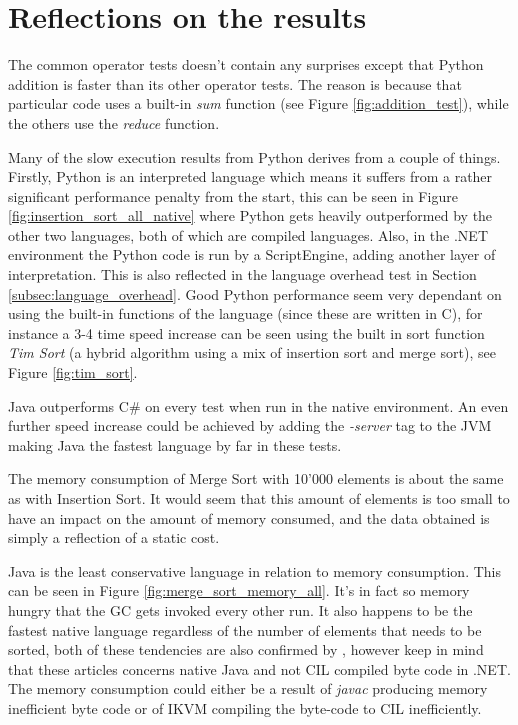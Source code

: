 \section{Reflections on the results}

The common operator tests doesn't contain any surprises except that Python addition is faster than its other operator tests. The reason is because that particular code uses a built-in \textit{sum} function (see Figure \ref{fig:addition_test}), while the others use the \textit{reduce} function.

Many of the slow execution results from Python derives from a couple of things. Firstly, Python is an interpreted language which means it suffers from a rather significant performance penalty from the start, this can be seen in Figure \ref{fig:insertion_sort_all_native} where Python gets heavily outperformed by the other two languages, both of which are compiled languages. Also, in the .NET environment the Python code is run by a ScriptEngine, adding another layer of interpretation. This is also reflected in the language overhead test in Section \ref{subsec:language_overhead}. Good Python performance seem very dependant on using the built-in functions of the language (since these are written in C), for instance a 3-4 time speed increase can be seen using the built in sort function \textit{Tim Sort} (a hybrid algorithm using a mix of insertion sort and merge sort), see Figure \ref{fig:tim_sort}.

Java outperforms C\# on every test when run in the native environment. An even further speed increase could be achieved by adding the \textit{-server} tag to the JVM making Java the fastest language by far in these tests.

The memory consumption of Merge Sort with 10'000 elements is about the same as with Insertion Sort. It would seem that this amount of elements is too small to have an impact on the amount of memory consumed, and the data obtained is simply a reflection of a static cost.

Java is the least conservative language in relation to memory consumption. This can be seen in Figure \ref{fig:merge_sort_memory_all}. It's in fact so memory hungry that the GC gets invoked every other run. It also happens to be the fastest native language regardless of the number of elements that needs to be sorted, both of these tendencies are also confirmed by \cite{Benchmark} \cite{Benchmark2}, however keep in mind that these articles concerns native Java and not CIL compiled byte code in .NET. The memory consumption could either be a result of \textit{javac} producing memory inefficient byte code or of IKVM compiling the byte-code to CIL inefficiently.

